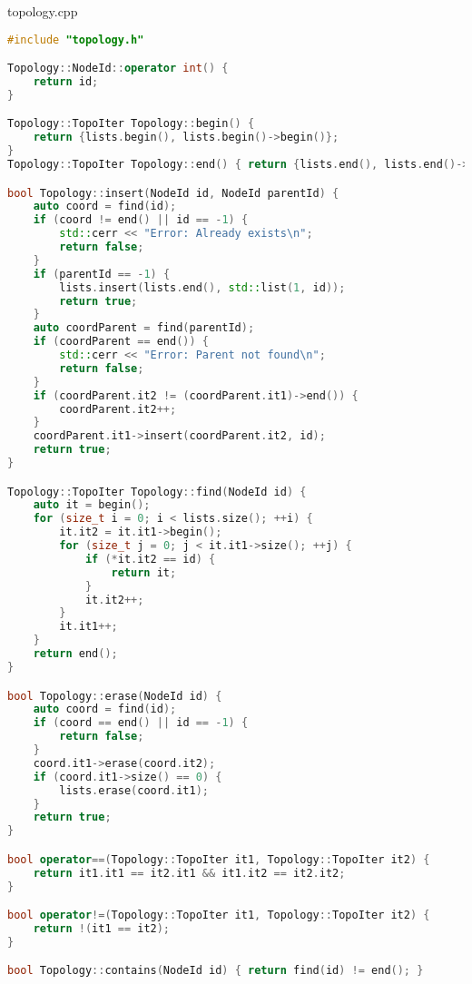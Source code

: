 \documentclass[a4paper, 12pt]{article}
\begin{document}
topology.cpp
\begin{lstlisting}[language=C++]
#include "topology.h"

Topology::NodeId::operator int() {
    return id;
}

Topology::TopoIter Topology::begin() {
    return {lists.begin(), lists.begin()->begin()};
}
Topology::TopoIter Topology::end() { return {lists.end(), lists.end()->end()}; }

bool Topology::insert(NodeId id, NodeId parentId) {
    auto coord = find(id);
    if (coord != end() || id == -1) {
        std::cerr << "Error: Already exists\n";
        return false;
    }
    if (parentId == -1) {
        lists.insert(lists.end(), std::list(1, id));
        return true;
    }
    auto coordParent = find(parentId);
    if (coordParent == end()) {
        std::cerr << "Error: Parent not found\n";
        return false;
    }
    if (coordParent.it2 != (coordParent.it1)->end()) {
        coordParent.it2++;
    }
    coordParent.it1->insert(coordParent.it2, id);
    return true;
}

Topology::TopoIter Topology::find(NodeId id) {
    auto it = begin();
    for (size_t i = 0; i < lists.size(); ++i) {
        it.it2 = it.it1->begin();
        for (size_t j = 0; j < it.it1->size(); ++j) {
            if (*it.it2 == id) {
                return it;
            }
            it.it2++;
        }
        it.it1++;
    }
    return end();
}

bool Topology::erase(NodeId id) {
    auto coord = find(id);
    if (coord == end() || id == -1) {
        return false;
    }
    coord.it1->erase(coord.it2);
    if (coord.it1->size() == 0) {
        lists.erase(coord.it1);
    }
    return true;
}

bool operator==(Topology::TopoIter it1, Topology::TopoIter it2) {
    return it1.it1 == it2.it1 && it1.it2 == it2.it2;
}

bool operator!=(Topology::TopoIter it1, Topology::TopoIter it2) {
    return !(it1 == it2);
}

bool Topology::contains(NodeId id) { return find(id) != end(); }

\end{lstlisting}
\end{document}
